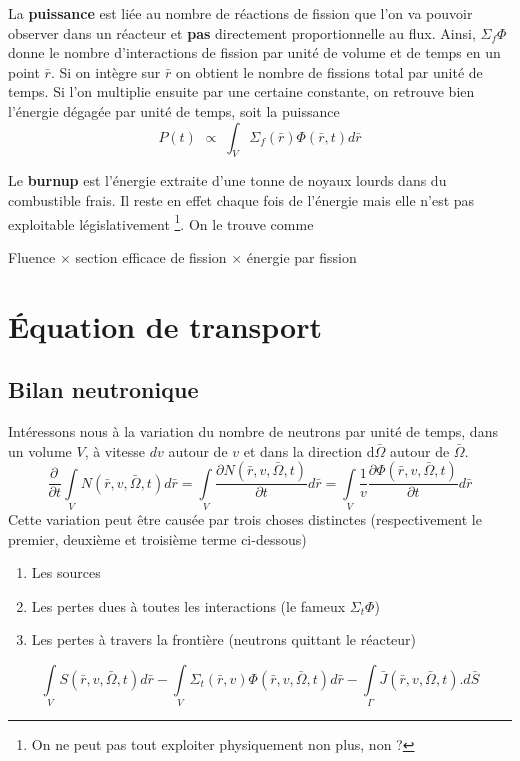 La \textbf{puissance} est liée au nombre de réactions de fission que l'on va pouvoir observer dans 
un réacteur et \textbf{pas} directement proportionnelle au flux. Ainsi, $\Sigma_f\varPhi$ donne 
le nombre d'interactions de fission par unité de volume et de temps en un point $\bar r$. Si on intègre 
sur $\bar r$ on obtient le nombre de fissions total par unité de temps. Si l'on multiplie ensuite par une 
certaine constante, on retrouve bien l'énergie dégagée par unité de temps, soit la puissance
\begin{equation}
P(t)\,\, \propto \;\int_V^{} {{\Sigma _f}(\bar r)\varPhi } (\bar r,t)d\bar r
\end{equation}

Le \textbf{burnup} est l'énergie extraite d'une tonne de noyaux lourds dans du combustible frais. Il 
reste en effet chaque fois de l'énergie mais elle n'est pas exploitable législativement
\footnote{On ne peut pas tout exploiter physiquement non plus, non ?}. On le 
trouve comme
\begin{center}
Fluence $\times$ section efficace de fission $\times$ énergie par fission
\end{center}


\section{Équation de transport}
\subsection{Bilan neutronique}
Intéressons nous à la variation du nombre de neutrons par unité de temps, dans un volume $V$, à 
vitesse $dv$ autour de $v$ et dans la direction d$\bar\Omega$ autour de $\bar \Omega$.
\begin{equation}
\frac{{\partial \,}}{{\partial t}}\int\limits_V    N(\bar r,v,\bar \Omega ,t)d\bar r = \int\limits_V    \frac{{\partial N(\bar r,v,\bar \Omega ,t)}}{{\partial t}}d\bar r = \int\limits_V    \frac{1}{v}\frac{{\partial \varPhi (\bar r,v,\bar \Omega ,t)}}{{\partial t}}d\bar r
\end{equation} 
Cette variation peut être causée par trois choses distinctes (respectivement le premier, deuxième 
et troisième terme ci-dessous)
\begin{enumerate}
\item Les sources
\item Les pertes dues à toutes les interactions (le fameux $\Sigma_t\varPhi$)
\item Les pertes à travers la frontière (neutrons quittant le réacteur)
\end{enumerate}
\begin{equation}
\int\limits_V    S(\bar r,v,\bar \Omega ,t)d\bar r - \int\limits_V    {\Sigma _t}(\bar r,v)\varPhi (\bar r,v,\bar \Omega ,t)d\bar r  - \int\limits_\Gamma     \bar J(\bar r,v,\bar \Omega ,t).d\bar S
\end{equation}
\newpage

